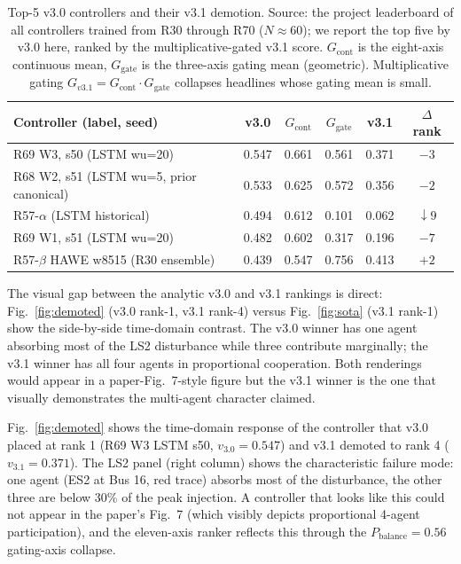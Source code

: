 \documentclass[journal,onecolumn,11pt]{IEEEtran}
\begin{document}
\begin{table}[!t]
  \centering
  \caption{Top-5 v3.0 controllers and their v3.1 demotion. Source:
  the project leaderboard of all controllers trained from R30
  through R70 ($N \approx 60$); we report the top five by v3.0
  here, ranked by the multiplicative-gated v3.1 score.
  $G_{\text{cont}}$ is the eight-axis continuous mean,
  $G_{\text{gate}}$ is the three-axis gating mean (geometric).
  Multiplicative gating $G_{v3.1} = G_{\text{cont}} \cdot
  G_{\text{gate}}$ collapses headlines whose gating mean is small.}
  \label{tab:demotion}
  \begin{tabular}{lccccc}
    \toprule
    Controller (label, seed)         & v3.0 & $G_{\text{cont}}$ & $G_{\text{gate}}$ & v3.1 & $\Delta$ rank \\
    \midrule
    R69 W3, s50 (LSTM wu=20)         & 0.547 & 0.661 & 0.561 & 0.371 & $-3$ \\
    R68 W2, s51 (LSTM wu=5, prior canonical) & 0.533 & 0.625 & 0.572 & 0.356 & $-2$ \\
    R57-$\alpha$ (LSTM historical)   & 0.494 & 0.612 & 0.101 & 0.062 & $\downarrow\!9$ \\
    R69 W1, s51 (LSTM wu=20)         & 0.482 & 0.602 & 0.317 & 0.196 & $-7$ \\
    R57-$\beta$ HAWE w8515 (R30 ensemble) & 0.439 & 0.547 & 0.756 & 0.413 & $+2$ \\
    \bottomrule
  \end{tabular}
\end{table}

The visual gap between the analytic v3.0 and v3.1 rankings is
direct: Fig.~\ref{fig:demoted} (v3.0 rank-1, v3.1 rank-4) versus
Fig.~\ref{fig:sota} (v3.1 rank-1) show the side-by-side time-domain
contrast. The v3.0 winner has one agent absorbing most of the LS2
disturbance while three contribute marginally; the v3.1 winner has
all four agents in proportional cooperation. Both renderings would
appear in a paper-Fig.~7-style figure but the v3.1 winner is the
one that visually demonstrates the multi-agent character claimed.

Fig.~\ref{fig:demoted} shows the time-domain response of the
controller that v3.0 placed at rank 1 (R69 W3 LSTM s50,
$v_{3.0} = 0.547$) and v3.1 demoted to rank 4 ($v_{3.1} = 0.371$).
The LS2 panel (right column) shows the characteristic failure mode:
one agent (ES2 at Bus 16, red trace) absorbs most of the
disturbance, the other three are below 30\% of the peak injection.
A controller that looks like this could not appear in the paper's
Fig.~7 (which visibly depicts proportional 4-agent participation),
and the eleven-axis ranker reflects this through the
$P_{\text{balance}} = 0.56$ gating-axis collapse.
\end{document}
